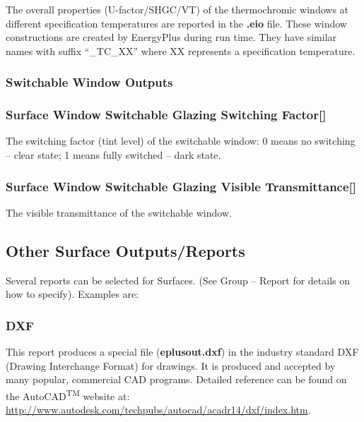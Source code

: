 The overall properties (U-factor/SHGC/VT) of the thermochromic windows at different specification temperatures are reported in the \textbf{.eio} file. These window constructions are created by EnergyPlus during run time. They have similar names with suffix ``\_TC\_XX'' where XX represents a specification temperature.

\subsubsection{Switchable Window Outputs}\label{switchable-window-outputs}

\subsubsection{Surface Window Switchable Glazing Switching Factor{[]}}\label{surface-window-switchable-glazing-switching-factor}

The switching factor (tint level) of the switchable window: 0 means no switching -- clear state; 1 means fully switched -- dark state.

\subsubsection{Surface Window Switchable Glazing Visible Transmittance{[]}}\label{surface-window-switchable-glazing-visible-transmittance}

The visible transmittance of the switchable window.

\subsection{Other Surface Outputs/Reports}\label{other-surface-outputsreports}

Several reports can be selected for Surfaces. (See Group -- Report for details on how to specify). Examples are:

\subsubsection{DXF}\label{dxf}

This report produces a special file (\textbf{eplusout.dxf}) in the industry standard DXF (Drawing Interchange Format) for drawings. It is produced and accepted by many popular, commercial CAD programs. Detailed reference can be found on the AutoCAD\textsuperscript{TM} website at: \url{http://www.autodesk.com/techpubs/autocad/acadr14/dxf/index.htm}.

